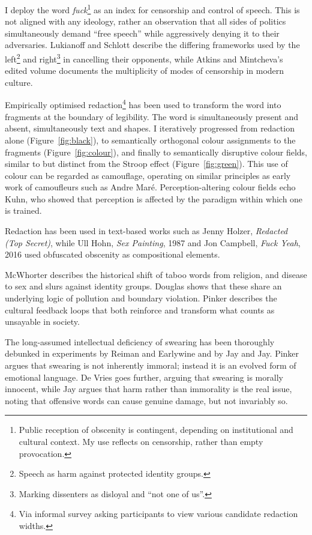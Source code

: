 \documentclass[12pt]{article}
\begin{document}
I deploy the word \emph{fuck}\footnote{Public reception of obscenity
  is contingent, depending on institutional and cultural context. My
  use reflects on censorship, rather than empty provocation.}  as an index
for censorship and control of speech. This is not aligned with any
ideology, rather an observation that all sides of politics
simultaneously demand ``free speech'' while aggressively denying it to
their adversaries. Lukianoff and Schlott\autocite[Chapters 6,
7]{lukianoff2023cancelling} describe the differing frameworks used by
the left\footnote{Speech as harm against protected identity groups.}
and right\footnote{Marking dissenters as disloyal and ``not one of
  us''.} in cancelling their opponents, while Atkins and Mintcheva's
edited volume documents the multiplicity of modes of censorship in
modern culture.\autocite{atkins2006censoring}

Empirically optimised redaction\footnote{Via informal survey asking
  participants to view various candidate redaction widths.} has been
used to transform the word into fragments at the boundary of
legibility. The word is simultaneously present and absent,
simultaneously text and shapes. I iteratively progressed from
redaction alone (Figure~\ref{fig:black}), to semantically orthogonal
colour assignments to the fragments (Figure~\ref{fig:colour}), and
finally to semantically disruptive colour fields, similar to but
distinct from the Stroop effect\autocite{stroop1935studies}
(Figure~\ref{fig:green}). This use of colour can be regarded as
camouflage, operating on similar principles as early work of
camoufleurs such as Andre Mar\'e. Perception-altering colour fields
echo Kuhn, who showed that perception is affected by the paradigm
within which one is trained.\autocite{kuhn1970structure}

Redaction has been used in text-based works such as Jenny Holzer,
\emph{Redacted (Top Secret)}, while Ull Hohn, \emph{Sex Painting},
1987 and Jon Campbell, \emph{Fuck Yeah}, 2016 used obfuscated obscenity
as compositional elements.

McWhorter describes the historical shift of taboo words from religion,
and disease to sex and slurs against identity
groups.\autocite{mcwhorter2024nine} Douglas shows that these share an
underlying logic of pollution and boundary violation.\autocite{douglas1966purity}
Pinker describes the cultural feedback loops that both reinforce and
transform what counts as unsayable in society.\autocite{pinker2008seven}

The long-assumed intellectual deficiency of swearing has been
thoroughly debunked in experiments by Reiman and
Earlywine\autocite{reiman2022swearfluency} and by Jay and
Jay.\autocite{jay2015taboo} Pinker argues that
swearing is not inherently immoral; instead it is an evolved form of
emotional language.\autocite{pinker2017moral} De Vries goes further, arguing that swearing is
morally innocent,\autocite{devries2023swearing} while Jay argues that harm
rather than immorality is the real issue, noting that offensive words
can cause genuine damage, but not invariably so.\autocite{jay2009offensive}
\end{document}
